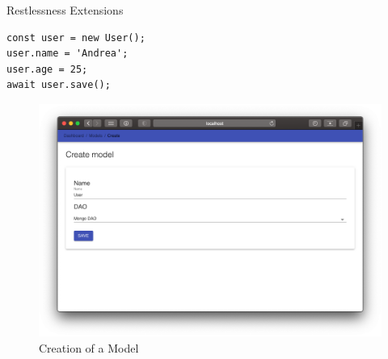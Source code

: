 \begin{chapter}{Restlessness Extensions}
    \bigskip
    \begin{lstlisting}[caption=User model usage, label={lst:user_model_usage}]
const user = new User();
user.name = 'Andrea';
user.age = 25;
await user.save();
    \end{lstlisting}

    \begin{figure}
        \centering
        \includegraphics[width=\linewidth]{source/images/rln-wi-create-model.png}
        \caption{Creation of a Model}
        \label{fig:wi_dao_mongo_model}
    \end{figure}

\end{chapter}